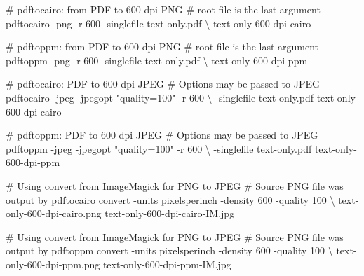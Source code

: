 \documentclass[
  a4paper,
]{article}
\newenvironment{Shaded}{\begin{snugshade}}{\end{snugshade}}
\newcommand{\AttributeTok}[1]{\textcolor[rgb]{0.80,0.80,0.80}{#1}}
\newcommand{\CommentTok}[1]{\textcolor[rgb]{0.50,0.62,0.50}{#1}}
\newcommand{\DataTypeTok}[1]{\textcolor[rgb]{0.87,0.87,0.75}{#1}}
\newcommand{\ExtensionTok}[1]{\textcolor[rgb]{0.80,0.80,0.80}{#1}}
\newcommand{\NormalTok}[1]{\textcolor[rgb]{0.80,0.80,0.80}{#1}}
\newcommand{\StringTok}[1]{\textcolor[rgb]{0.80,0.58,0.58}{#1}}
\begin{document}
\begin{Shaded}
\begin{Highlighting}[]
\CommentTok{\# \textasciigrave{}pdftocairo\textasciigrave{}: from PDF to 600 dpi PNG}
\CommentTok{\# root file is the last argument}
\ExtensionTok{pdftocairo} \AttributeTok{{-}png} \AttributeTok{{-}r}\NormalTok{ 600 }\AttributeTok{{-}singlefile}\NormalTok{ text{-}only.pdf }\DataTypeTok{\textbackslash{}}
\NormalTok{text{-}only{-}600{-}dpi{-}cairo}

\CommentTok{\# \textasciigrave{}pdftoppm\textasciigrave{}: from PDF to 600 dpi PNG}
\CommentTok{\# root file is the last argument}
\ExtensionTok{pdftoppm} \AttributeTok{{-}png} \AttributeTok{{-}r}\NormalTok{ 600 }\AttributeTok{{-}singlefile}\NormalTok{ text{-}only.pdf }\DataTypeTok{\textbackslash{}}
\NormalTok{text{-}only{-}600{-}dpi{-}ppm}

\CommentTok{\# \textasciigrave{}pdftocairo\textasciigrave{}: PDF to 600 dpi JPEG}
\CommentTok{\# Options may be passed to JPEG}
\ExtensionTok{pdftocairo} \AttributeTok{{-}jpeg} \AttributeTok{{-}jpegopt} \StringTok{"quality=100"} \AttributeTok{{-}r}\NormalTok{ 600 }\DataTypeTok{\textbackslash{}}
\NormalTok{{-}singlefile text{-}only.pdf text{-}only{-}600{-}dpi{-}cairo}

\CommentTok{\# \textasciigrave{}pdftoppm\textasciigrave{}: PDF to 600 dpi JPEG}
\CommentTok{\# Options may be passed to JPEG}
\ExtensionTok{pdftoppm} \AttributeTok{{-}jpeg} \AttributeTok{{-}jpegopt} \StringTok{"quality=100"} \AttributeTok{{-}r}\NormalTok{ 600 }\DataTypeTok{\textbackslash{}}
\NormalTok{{-}singlefile text{-}only.pdf text{-}only{-}600{-}dpi{-}ppm}

\CommentTok{\# Using \textasciigrave{}convert\textasciigrave{} from ImageMagick for PNG to JPEG}
\CommentTok{\# Source PNG file was output by \textasciigrave{}pdftocairo\textasciigrave{}}
\ExtensionTok{convert} \AttributeTok{{-}units}\NormalTok{ pixelsperinch }\AttributeTok{{-}density}\NormalTok{ 600 }\AttributeTok{{-}quality}\NormalTok{ 100 }\DataTypeTok{\textbackslash{}}
\NormalTok{text{-}only{-}600{-}dpi{-}cairo.png text{-}only{-}600{-}dpi{-}cairo{-}IM.jpg}

\CommentTok{\# Using \textasciigrave{}convert\textasciigrave{} from ImageMagick for PNG to JPEG}
\CommentTok{\# Source PNG file was output by \textasciigrave{}pdftoppm\textasciigrave{}}
\ExtensionTok{convert} \AttributeTok{{-}units}\NormalTok{ pixelsperinch }\AttributeTok{{-}density}\NormalTok{ 600 }\AttributeTok{{-}quality}\NormalTok{ 100 }\DataTypeTok{\textbackslash{}}
\NormalTok{text{-}only{-}600{-}dpi{-}ppm.png text{-}only{-}600{-}dpi{-}ppm{-}IM.jpg}
\end{Highlighting}
\end{Shaded}
\end{document}
